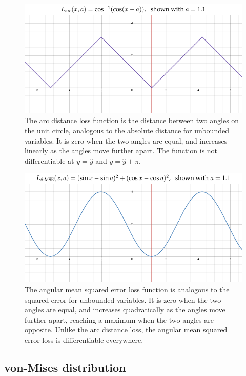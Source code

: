 \begin{figure}
    \centering
    \includegraphics[width=0.9\linewidth]{figures/loss-arc.pdf}
    \captionsetup{parskip=7pt}
    \caption[Arc distance loss]{The arc distance loss function is the distance between two angles on the unit circle, analogous to the absolute distance for unbounded variables. It is zero when the two angles are equal, and increases linearly as the angles move further apart. The function is not differentiable at $y = \hat{y}$ and $y = \hat{y} + \pi$.}
    \label{fig:loss-arc}
\end{figure}
\begin{figure}
    \centering
    \includegraphics[width=0.9\linewidth]{figures/loss-amse.pdf}
    \captionsetup{parskip=7pt}
    \caption[Angular mean squared error loss]{The angular mean squared error loss function is analogous to the squared error for unbounded variables. It is zero when the two angles are equal, and increases quadratically as the angles move further apart, reaching a maximum when the two angles are opposite. Unlike the arc distance loss, the angular mean squared error loss is differentiable everywhere.}
    \label{fig:loss-amse}
\end{figure}

\clearpage


\subsection{von-Mises distribution}
\label{ss:von-mises}

